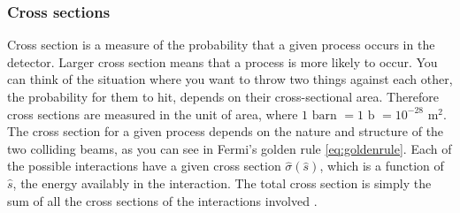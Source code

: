 \subsubsection{Cross sections}
Cross section is a measure of the probability that a given process occurs in the detector. Larger cross section means that a process is more likely to occur. You can think of the situation where you want to throw two things against each other, the probability for them to hit, depends on their cross-sectional area. Therefore cross sections are measured in the unit of area, where $1\mbox{ barn }=1\mbox{ b }= 10^{-28}$ m$^{2}$. The cross section for a given process depends on the nature and structure of the two colliding beams, as you can see in Fermi's golden rule \eqref{eq:goldenrule}. Each of the possible interactions have a given cross section $\hat \sigma(\hat s)$, which is a function of $\hat s$, the energy availably in the interaction. The total cross section is simply the sum of all the cross sections of the interactions involved \cite{griffiths1987iep}.

